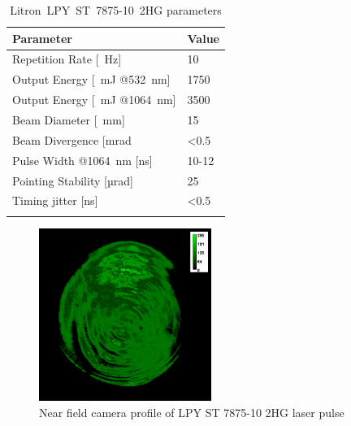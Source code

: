 \documentclass[sn-nature]{sn-jnl}%
\theoremstyle{thmstyleone}%
\theoremstyle{thmstyletwo}%
\theoremstyle{thmstylethree}%
\begin{document}
    \begin{table}[h!]
    \caption{Litron~LPY~ST~7875-10~2HG parameters}\label{tab:litronparameters}%
    \begin{tabular}{@{}ll@{}}
    \toprule    
    Parameter & Value  \\
    \midrule
    Repetition Rate [\SI{}{\hertz}] & 10    \\
    Output Energy [\SI{}{\milli\joule}  @\SI{532}{\nano\meter}] & 1750\footnotemark[1]    \\
    Output Energy [\SI{}{\milli\joule}  @\SI{1064}{\nano\meter}] & 3500 \\
    Beam Diameter [\SI[]{}{\mm}] & 15    \\
    Beam Divergence [mrad & \textless 0.5\footnotemark[2]    \\
    Pulse Width @\SI{1064}{\nano\meter} [ns] & 10-12    \\
    Pointing Stability [µrad] & 25\footnotemark[3]      \\
    Timing jitter [ns] & \textless 0.5\footnotemark[4]      \\
    \botrule
    \end{tabular}
    \end{table}


    \begin{figure}[h!]     
    \centering
    \includegraphics[width=0.5\textwidth]{C2-v3_36_mJ_scale.png}
    \caption{Near field camera profile of LPY ST 7875-10 2HG laser pulse}
    \label{fig:profile}
    \end{figure}
\end{document}
